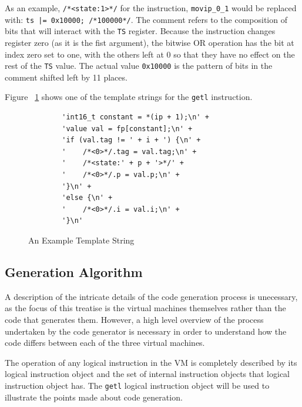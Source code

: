 \documentclass[english,a4paper,12pt]{report}
\begin{document}
As an example, \verb|/*<state:1>*/| for the instruction,
\verb|movip_0_1| would be replaced with:
\verb+ts |= 0x10000; /*100000*/+. The comment refers to the
composition of bits that will interact with the \verb|TS|
register. Because the instruction changes register zero (as it is the
fist argument), the bitwise OR operation has the bit at index zero set
to one, with the others left at 0 so that they have no effect on the
rest of the \verb|TS| value. The actual value \verb|0x10000| is the
pattern of bits in the comment shifted left by 11 places.

Figure ~\ref{fig:template-string} shows one of the template strings
for the \verb|getl| instruction.

\begin{figure}
	\begin{lstlisting}
		'int16_t constant = *(ip + 1);\n' +
		'value val = fp[constant];\n' +
		'if (val.tag != ' + i + ') {\n' +
		'    /*<0>*/.tag = val.tag;\n' +
		'    /*<state:' + p + '>*/' +
		'    /*<0>*/.p = val.p;\n' +
		'}\n' +
		'else {\n' +
		'    /*<0>*/.i = val.i;\n' +
		'}\n'
	\end{lstlisting}
	\caption{An Example Template String}
	\label{fig:template-string}
\end{figure}


\subsection{Generation Algorithm}
\label{sec:generation-algorithm}
A description of the intricate details of the code generation process
is unecessary, as the focus of this treatise is the virtual machines
themselves rather than the code that generates them. However, a high
level overview of the process undertaken by the code generator is
necessary in order to understand how the code differs between each of
the three virtual machines.

The operation of any logical instruction in the VM is completely
described by its logical instruction object and the set of internal
instruction objects that logical instruction object has. The
\verb|getl| logical instruction object will be used to illustrate the
points made about code generation.
\end{document}

